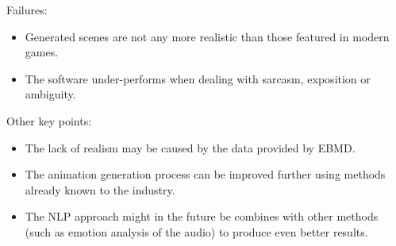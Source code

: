 \noindent Failures:
\begin{itemize}
	\item Generated scenes are not any more realistic than those featured in modern games.
	\item The software under-performs when dealing with sarcasm, exposition or ambiguity.
\end{itemize}

\noindent Other key points:
\begin{itemize}
	\item The lack of realism may be caused by the data provided by EBMD.
	\item The animation generation process can be improved further using methods already known to the industry.
	\item The NLP approach might in the future be combines with other methods (such as emotion analysis of the audio) to produce even better results.
\end{itemize}




